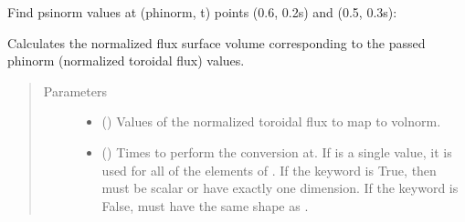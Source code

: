 \documentclass[letterpaper,10pt,english]{sphinxmanual}
\begin{document}
\begin{fulllineitems}
\begin{fulllineitems}
Find psinorm values at (phinorm, t) points (0.6, 0.2s) and (0.5, 0.3s):

\begin{sphinxVerbatim}[commandchars=\\\{\}]
  \PYG{p}{[} \PYG{p}{]} \PYG{p}{[} \PYG{p}{]} 
\end{sphinxVerbatim}

\end{fulllineitems}


\begin{fulllineitems}
\label{\detokenize{eqtools:eqtools.core.Equilibrium.phinorm2volnorm}}
Calculates the normalized flux surface volume corresponding to the passed phinorm (normalized toroidal flux) values.
\begin{quote}\begin{description}
\item[{Parameters}] \leavevmode\begin{itemize}
\item {} 
 () \textendash{} Values of the normalized
toroidal flux to map to volnorm.

\item {} 
 () \textendash{} Times to perform the conversion at.
If  is a single value, it is used for all of the elements of
. If the  keyword is True, then  must be scalar
or have exactly one dimension. If the  keyword is False,
 must have the same shape as .


\end{itemize}
\end{description}
\end{quote}
\end{fulllineitems}
\end{fulllineitems}
\end{document}

